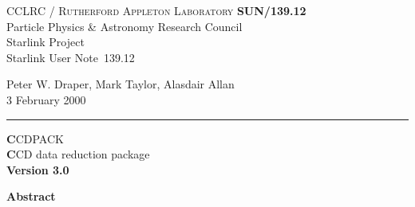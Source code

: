 \documentclass[twoside,11pt]{article}
\newcommand{\stardoccategory}  {Starlink User Note}
\newcommand{\stardocinitials}  {SUN}
\newcommand{\stardocnumber}    {139.12}
\newcommand{\stardocauthors}   {Peter W. Draper, Mark Taylor, Alasdair Allan}
\newcommand{\stardocdate}      {3 February 2000}
\newcommand{\stardoctitle}     {CCDPACK}
\newcommand{\stardoconeline}   {CCD data reduction package}
\newcommand{\stardocversion}   {Version 3.0}
\newcommand{\stardocname}{\stardocinitials /\stardocnumber}
\newenvironment{latexonly}{}{}
\renewcommand{\_}{\texttt{\symbol{95}}}
\begin{document}
\thispagestyle{empty}

\begin{latexonly}
   CCLRC / \textsc{Rutherford Appleton Laboratory} \hfill \textbf{\stardocname}\\
   {\large Particle Physics \& Astronomy Research Council}\\
   {\large Starlink Project\\}
   {\large \stardoccategory\ \stardocnumber}
   \begin{flushright}
   \stardocauthors\\
   \stardocdate
   \end{flushright}
   \vspace{-4mm}
   \rule{\textwidth}{0.5mm}
   \vspace{5mm}
   \begin{center}
   {\Huge\textbf  \stardoctitle \\ [2.5ex]}
   {\LARGE\textbf \stardoconeline \\ [4ex]}
   {\large \bf \stardocversion}
   \end{center}
   \vspace{5mm}


   \vspace{10mm}
   \begin{center}
      {\Large\textbf{Abstract}}
   \end{center}
\end{latexonly}
\end{document}

